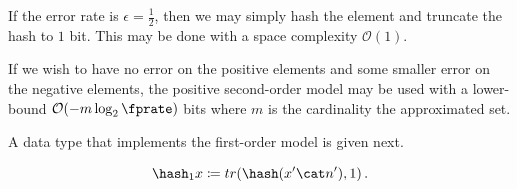 \documentclass[ ../main.tex]{subfiles}
\begin{document}
If the error rate is $\epsilon = \frac{1}{2}$, then we may simply hash the element and truncate the hash to $1$ bit.
This may be done with a space complexity $\mathcal{O}(1)$.

If we wish to have no error on the positive elements and some smaller error on the negative elements, the positive second-order model may be used with a lower-bound $\mathcal{O}(-m \log_2 \fprate)$ bits where $m$ is the cardinality the approximated set.

A data type that implements the first-order model is given next.


\begin{equation}
	\hash_1 x \coloneqq \trunc(\hash (x' \cat n'),1)\,.
\end{equation}
\end{document}
